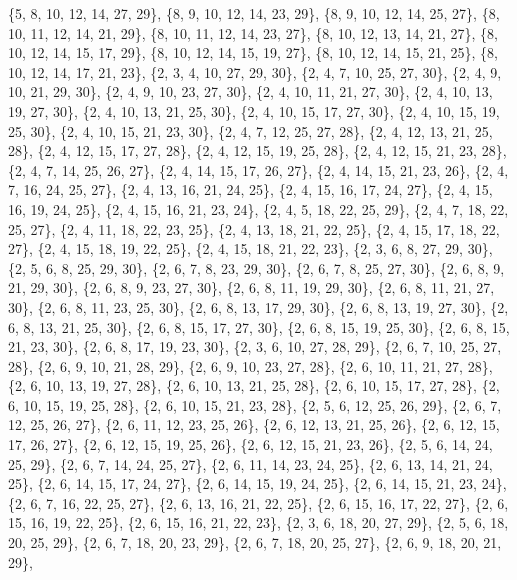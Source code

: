 \documentclass[11pt,a4paper]{article}
\begin{document}
{\{5, 8, 10, 12, 14, 27, 29\}, \{8, 9, 10, 12, 14, 23, 29\}, \{8, 9, 10, 12, 14, 25, 27\}, \{8, 10, 11, 12, 14, 21, 29\}, \{8, 10, 11, 12, 14, 23, 27\},
\{8, 10, 12, 13, 14, 21, 27\}, \{8, 10, 12, 14, 15, 17, 29\}, \{8, 10, 12, 14, 15, 19, 27\}, \{8, 10, 12, 14, 15, 21, 25\}, \{8, 10, 12, 14, 17, 21, 23\},
\{2, 3, 4, 10, 27, 29, 30\}, \{2, 4, 7, 10, 25, 27, 30\}, \{2, 4, 9, 10, 21, 29, 30\}, \{2, 4, 9, 10, 23, 27, 30\}, \{2, 4, 10, 11, 21, 27, 30\},
\{2, 4, 10, 13, 19, 27, 30\}, \{2, 4, 10, 13, 21, 25, 30\}, \{2, 4, 10, 15, 17, 27, 30\}, \{2, 4, 10, 15, 19, 25, 30\}, \{2, 4, 10, 15, 21, 23, 30\},
\{2, 4, 7, 12, 25, 27, 28\}, \{2, 4, 12, 13, 21, 25, 28\}, \{2, 4, 12, 15, 17, 27, 28\}, \{2, 4, 12, 15, 19, 25, 28\}, \{2, 4, 12, 15, 21, 23, 28\},
\{2, 4, 7, 14, 25, 26, 27\}, \{2, 4, 14, 15, 17, 26, 27\}, \{2, 4, 14, 15, 21, 23, 26\}, \{2, 4, 7, 16, 24, 25, 27\}, \{2, 4, 13, 16, 21, 24, 25\},
\{2, 4, 15, 16, 17, 24, 27\}, \{2, 4, 15, 16, 19, 24, 25\}, \{2, 4, 15, 16, 21, 23, 24\}, \{2, 4, 5, 18, 22, 25, 29\}, \{2, 4, 7, 18, 22, 25, 27\},
\{2, 4, 11, 18, 22, 23, 25\}, \{2, 4, 13, 18, 21, 22, 25\}, \{2, 4, 15, 17, 18, 22, 27\}, \{2, 4, 15, 18, 19, 22, 25\}, \{2, 4, 15, 18, 21, 22, 23\},
\{2, 3, 6, 8, 27, 29, 30\}, \{2, 5, 6, 8, 25, 29, 30\}, \{2, 6, 7, 8, 23, 29, 30\}, \{2, 6, 7, 8, 25, 27, 30\}, \{2, 6, 8, 9, 21, 29, 30\},
\{2, 6, 8, 9, 23, 27, 30\}, \{2, 6, 8, 11, 19, 29, 30\}, \{2, 6, 8, 11, 21, 27, 30\}, \{2, 6, 8, 11, 23, 25, 30\}, \{2, 6, 8, 13, 17, 29, 30\},
\{2, 6, 8, 13, 19, 27, 30\}, \{2, 6, 8, 13, 21, 25, 30\}, \{2, 6, 8, 15, 17, 27, 30\}, \{2, 6, 8, 15, 19, 25, 30\}, \{2, 6, 8, 15, 21, 23, 30\},
\{2, 6, 8, 17, 19, 23, 30\}, \{2, 3, 6, 10, 27, 28, 29\}, \{2, 6, 7, 10, 25, 27, 28\}, \{2, 6, 9, 10, 21, 28, 29\}, \{2, 6, 9, 10, 23, 27, 28\},
\{2, 6, 10, 11, 21, 27, 28\}, \{2, 6, 10, 13, 19, 27, 28\}, \{2, 6, 10, 13, 21, 25, 28\}, \{2, 6, 10, 15, 17, 27, 28\}, \{2, 6, 10, 15, 19, 25, 28\},
\{2, 6, 10, 15, 21, 23, 28\}, \{2, 5, 6, 12, 25, 26, 29\}, \{2, 6, 7, 12, 25, 26, 27\}, \{2, 6, 11, 12, 23, 25, 26\}, \{2, 6, 12, 13, 21, 25, 26\},
\{2, 6, 12, 15, 17, 26, 27\}, \{2, 6, 12, 15, 19, 25, 26\}, \{2, 6, 12, 15, 21, 23, 26\}, \{2, 5, 6, 14, 24, 25, 29\}, \{2, 6, 7, 14, 24, 25, 27\},
\{2, 6, 11, 14, 23, 24, 25\}, \{2, 6, 13, 14, 21, 24, 25\}, \{2, 6, 14, 15, 17, 24, 27\}, \{2, 6, 14, 15, 19, 24, 25\}, \{2, 6, 14, 15, 21, 23, 24\},
\{2, 6, 7, 16, 22, 25, 27\}, \{2, 6, 13, 16, 21, 22, 25\}, \{2, 6, 15, 16, 17, 22, 27\}, \{2, 6, 15, 16, 19, 22, 25\}, \{2, 6, 15, 16, 21, 22, 23\},
\{2, 3, 6, 18, 20, 27, 29\}, \{2, 5, 6, 18, 20, 25, 29\}, \{2, 6, 7, 18, 20, 23, 29\}, \{2, 6, 7, 18, 20, 25, 27\}, \{2, 6, 9, 18, 20, 21, 29\},
}
\end{document}
